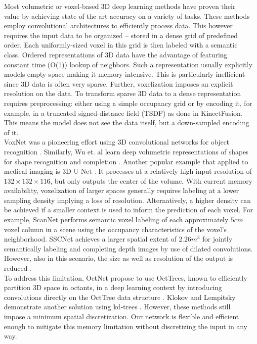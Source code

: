 \documentclass[runningheads]{llncs}
\begin{document}
Most volumetric or voxel-based 3D deep learning methods have proven their value by achieving state of the art accuracy \cite{Dai2017,Maturana2015,Cicek2016,Milletari2016,Song2016} on a variety of tasks. These methods employ convolutional architectures to efficiently process data. This however requires the input data to be organized -- stored in a dense grid of predefined order. Each uniformly-sized voxel in this grid is then labeled with a semantic class. Ordered representations of 3D data have the advantage of featuring constant time (O(1)) lookup of neighbors. Such a representation usually explicitly models empty space making it memory-intensive. This is particularly inefficient since 3D data is often very sparse. Further, voxelization imposes an explicit resolution on the data. To transform sparse 3D data to a dense representation requires preprocessing: either using a simple occupancy grid or by encoding it, for example, in a truncated signed-distance field (TSDF) as done in KinectFusion\cite{Izadi2011,Song2016}. This means the model does not see the data itself, but a down-sampled encoding of it.\\

VoxNet was a pioneering effort using 3D convolutional networks for object recognition \cite{Maturana2015}.
Similarly, Wu et. al learn deep volumetric representations of shapes for shape recognition and completion \cite{Wu2015}. Another popular example that applied to medical imaging is 3D U-Net \cite{Cicek2016}. It processes at a relatively high input resolution of $132 \times 132 \times 116$, but only outputs the center of the volume. With current memory availability, voxelization of larger spaces generally requires labeling at a lower sampling density implying a loss of resolution. Alternatively, a higher density can be achieved if a smaller context is used to inform the prediction of each voxel. For example, ScanNet \cite{Dai2017} performs semantic voxel labeling of each approximately $5cm$ voxel column in a scene using the occupancy characteristics of the voxel's neighborhood.
SSCNet achieves a larger spatial extent of $2.26m^3$ for jointly semantically labeling and completing depth images by use of dilated convolutions. However, also in this scenario, the size as well as resolution of the output is reduced \cite{Song2016}.
\\

To address this limitation, OctNet propose to use OctTrees, known to efficiently partition 3D space in octants, in a deep learning context by introducing convolutions directly on the OctTree data structure \cite{Riegler2017}. Klokov and Lempitsky demonstrate another solution using kd-trees \cite{Klokov2017}. However, these methods still impose a minimum spatial discretization. Our network is flexible and efficient enough to mitigate this memory limitation without discretizing the input in any way.
\end{document}
